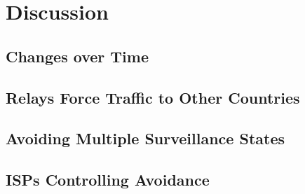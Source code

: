 \section{Discussion}
\label{discussion}

\subsection{Changes over Time}

\subsection{Relays Force Traffic to Other Countries}

\subsection{Avoiding Multiple Surveillance States}

\subsection{ISPs Controlling Avoidance}
